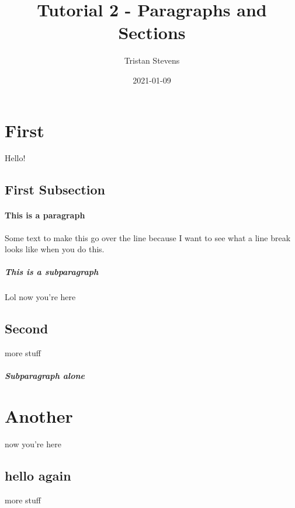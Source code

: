 \documentclass{article}
\title{Tutorial 2 - Paragraphs and Sections}
\date{2021-01-09}
\author{Tristan Stevens}
\begin{document}
	\maketitle
	\newpage

	\section{First}
	Hello!
	\subsection{First Subsection}
	\paragraph{This is a paragraph}
	Some text to make this go over the line because I want to see what a line break looks like when you do this.
	\subparagraph{This is a subparagraph}
	Lol now you're here
	\subsection{Second}
	more stuff
	\subparagraph{Subparagraph alone}
	\section{Another}
	now you're here
	\subsection{hello again}
	more stuff
\end{document}
